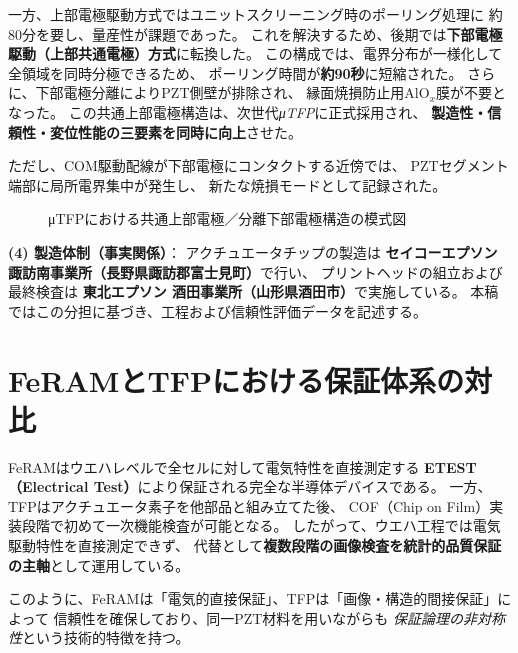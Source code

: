 \documentclass[conference]{IEEEtran}
\begin{document}
一方、上部電極駆動方式ではユニットスクリーニング時のポーリング処理に
約80分を要し、量産性が課題であった。
これを解決するため、後期では\textbf{下部電極駆動（上部共通電極）方式}に転換した。
この構成では、電界分布が一様化して全領域を同時分極できるため、
ポーリング時間が\textbf{約90秒}に短縮された。
さらに、下部電極分離によりPZT側壁が排除され、
縁面焼損防止用AlO$_x$膜が不要となった。
この共通上部電極構造は、次世代\textit{μTFP}に正式採用され、
\textbf{製造性・信頼性・変位性能の三要素を同時に向上}させた。

ただし、COM駆動配線が下部電極にコンタクトする近傍では、
PZTセグメント端部に局所電界集中が発生し、
新たな焼損モードとして記録された。

\begin{figure}[!t]
\centering
{}
\caption{μTFPにおける共通上部電極／分離下部電極構造の模式図}
\label{fig:utfp_structure}
\end{figure}

\medskip
\noindent
\textbf{(4) 製造体制（事実関係）}：
アクチュエータチップの製造は
\textbf{セイコーエプソン 諏訪南事業所（長野県諏訪郡富士見町）}で行い、
プリントヘッドの組立および最終検査は
\textbf{東北エプソン 酒田事業所（山形県酒田市）}で実施している。
本稿ではこの分担に基づき、工程および信頼性評価データを記述する。

\section{FeRAMとTFPにおける保証体系の対比}
FeRAMはウエハレベルで全セルに対して電気特性を直接測定する
\textbf{ETEST（Electrical Test）}により保証される完全な半導体デバイスである。
一方、TFPはアクチュエータ素子を他部品と組み立てた後、
COF（Chip on Film）実装段階で初めて一次機能検査が可能となる。
したがって、ウエハ工程では電気駆動特性を直接測定できず、
代替として\textbf{複数段階の画像検査を統計的品質保証の主軸}として運用している。

このように、FeRAMは「電気的直接保証」、TFPは「画像・構造的間接保証」によって
信頼性を確保しており、同一PZT材料を用いながらも
\emph{保証論理の非対称性}という技術的特徴を持つ。
\end{document}
